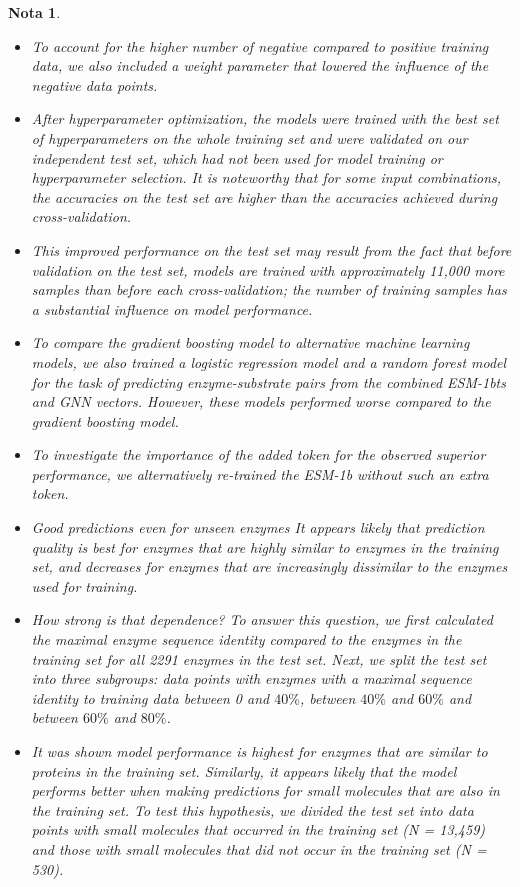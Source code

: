 \documentclass[12pt]{article}
\newtheorem{Note}{Nota}%
\begin{document}
\begin{Note}
\begin{itemize}
\item To account for the higher number of negative compared to positive training data, we also included a weight parameter that lowered the influence of the negative data points. 

\item After hyperparameter optimization, the models were trained with the best  set of hyperparameters on the whole training set and were validated on our independent test set, which had not been used for model training or hyperparameter selection. It is noteworthy that for some input combinations, the accuracies on the test set are higher than the accuracies achieved during cross-validation.

\item This improved performance on the test set may result from the fact that before validation on the test set, models are trained with approximately 11,000 more samples than before each cross-validation; the number of training samples has a substantial influence on model performance.

\item To compare the gradient boosting model to alternative machine learning models, we also trained a logistic regression model and a
random forest model for the task of predicting enzyme-substrate pairs from the combined ESM-1bts and GNN vectors. However, these models performed worse compared to the gradient boosting model. 

\item To investigate the importance of the added token for the observed superior performance, we alternatively re-trained the ESM-1b
without such an extra token.

\item Good predictions even for unseen enzymes It appears likely that prediction quality is best for enzymes that are highly similar to enzymes in the training set, and decreases for enzymes that are increasingly dissimilar to the enzymes used for training. 

\item How strong is that dependence? To answer this question, we first calculated the maximal enzyme sequence identity compared to
the enzymes in the training set for all 2291 enzymes in the test set. Next, we split the test set into three subgroups: data points with
enzymes with a maximal sequence identity to training data between 0 and $40\%$, between $40\%$ and $60\%$ and between $60\%$ and $80\%$.


\item It was shown model performance is highest for enzymes that are similar to proteins in the training set. Similarly, it appears likely that the model performs better when making predictions for small molecules that are also in the training set. To test this hypothesis, we divided the test set into data points with small molecules that occurred in the training set (N = 13,459) and those with small molecules that did not occur in the training set (N = 530).



\end{itemize}
\end{Note}
\end{document}
